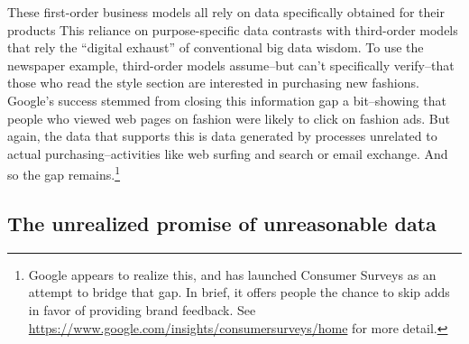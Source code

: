\documentclass[12pt]{article}
\begin{document}
These first-order business models all rely on data specifically
obtained for their products This reliance on purpose-specific data contrasts with third-order
models that rely the ``digital exhaust'' of conventional big data
wisdom. To use the newspaper example, third-order models assume--but
can't specifically verify--that those who read the style section are
interested in purchasing new fashions. Google's success stemmed from closing this
information gap a bit--showing that people who viewed web pages on
fashion were likely to click on fashion ads. But
again, the data that supports this is data generated by processes
unrelated to actual purchasing--activities like web surfing and search
or email exchange. And so the gap remains.\footnote{Google appears to
  realize this, and has launched Consumer Surveys as an attempt to
  bridge that gap. In brief, it offers people the chance to skip adds
  in favor of providing brand feedback. See
  \url{https://www.google.com/insights/consumersurveys/home} for more detail.}



\subsection{The unrealized promise of unreasonable data}
\label{sec:unre-prom-unre}
\end{document}

